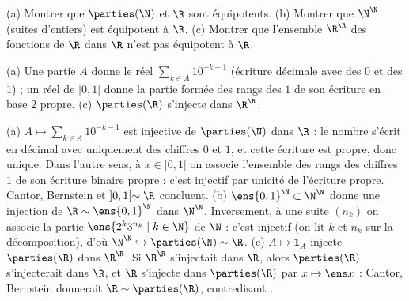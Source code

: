 \begin{exo}
(a) Montrer que $\parties(\N)$ et $\R$ sont équipotents.
(b) Montrer que $\N^{\N}$ (suites d'entiers) est équipotent à $\R$.
(c) Montrer que l'ensemble $\R^{\R}$ des fonctions de $\R$ dans $\R$ n'est pas équipotent à $\R$.
\begin{indication}
(a) Une partie $A$ donne le réel $\sum_{k\in A}10^{-k-1}$ (écriture décimale avec des $0$ et des $1$) ; un réel de $]0,1[$ donne la partie formée des rangs des $1$ de son écriture en base $2$ propre. (c) $\parties(\R)$ s'injecte dans $\R^{\R}$.
\end{indication}
\begin{corrige}
(a) $A\mapsto\sum_{k\in A}10^{-k-1}$ est injective de $\parties(\N)$ dans $\R$ : le nombre s'écrit en décimal avec uniquement des chiffres $0$ et $1$, et cette écriture est propre, donc unique. Dans l'autre sens, à $x\in]0,1[$ on associe l'ensemble des rangs des chiffres $1$ de son écriture binaire propre : c'est injectif par unicité de l'écriture propre. Cantor, Bernstein et $]0,1[\sim\R$ concluent.
(b) $\ens{0,1}^{\N}\subset\N^{\N}$ donne une injection de $\R\sim\ens{0,1}^{\N}$ dans $\N^{\N}$. Inversement, à une suite $(n_k)$ on associe la partie $\ens{2^{k}3^{n_k}\mid k\in\N}$ de $\N$ : c'est injectif (on lit $k$ et $n_k$ sur la décomposition), d'où $\N^{\N}\hookrightarrow\parties(\N)\sim\R$.
(c) $A\mapsto\mathbf 1_A$ injecte $\parties(\R)$ dans $\R^{\R}$. Si $\R^{\R}$ s'injectait dans $\R$, alors $\parties(\R)$ s'injecterait dans $\R$, et $\R$ s'injecte dans $\parties(\R)$ par $x\mapsto\ens x$ : Cantor, Bernstein donnerait $\R\sim\parties(\R)$, contredisant .
\end{corrige}
\end{exo}

